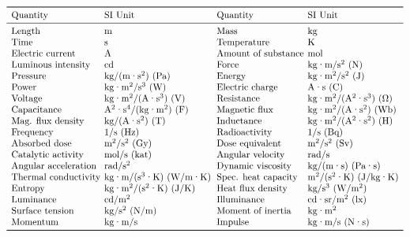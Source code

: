 {\[
\begin{array}{l@{\hskip 4pt}l@{\hskip 6pt}l@{\hskip 4pt}l}
\toprule
\text{Quantity} & \text{SI Unit} & \text{Quantity} & \text{SI Unit} \\
\midrule
\text{Length} & \text{m} & \text{Mass} & \text{kg} \\
\text{Time} & \text{s} & \text{Temperature} & \text{K} \\
\text{Electric current} & \text{A} & \text{Amount of substance} & \text{mol} \\
\text{Luminous intensity} & \text{cd} & \text{Force} & \text{kg·m/s$^2$ (N)} \\
\text{Pressure} & \text{kg/(m·s$^2$) (Pa)} & \text{Energy} & \text{kg·m$^2$/s$^2$ (J)} \\
\text{Power} & \text{kg·m$^2$/s$^3$ (W)} & \text{Electric charge} & \text{A·s (C)} \\
\text{Voltage} & \text{kg·m$^2$/(A·s$^3$) (V)} & \text{Resistance} & \text{kg·m$^2$/(A$^2$·s$^3$) ($\Omega$)} \\
\text{Capacitance} & \text{A$^2$·s$^4$/(kg·m$^2$) (F)} & \text{Magnetic flux} & \text{kg·m$^2$/(A·s$^2$) (Wb)} \\
\text{Mag. flux density} & \text{kg/(A·s$^2$) (T)} & \text{Inductance} & \text{kg·m$^2$/(A$^2$·s$^2$) (H)} \\
\text{Frequency} & \text{1/s (Hz)} & \text{Radioactivity} & \text{1/s (Bq)} \\
\text{Absorbed dose} & \text{m$^2$/s$^2$ (Gy)} & \text{Dose equivalent} & \text{m$^2$/s$^2$ (Sv)} \\
\text{Catalytic activity} & \text{mol/s (kat)} & \text{Angular velocity} & \text{rad/s} \\
\text{Angular acceleration} & \text{rad/s$^2$} & \text{Dynamic viscosity} & \text{kg/(m·s) (Pa·s)} \\
\text{Thermal conductivity} & \text{kg·m/(s$^3$·K) (W/m·K)} & \text{Spec. heat capacity} & \text{m$^2$/(s$^2$·K) (J/kg·K)} \\
\text{Entropy} & \text{kg·m$^2$/(s$^2$·K) (J/K)} & \text{Heat flux density} & \text{kg/s$^3$ (W/m$^2$)} \\
\text{Luminance} & \text{cd/m$^2$} & \text{Illuminance} & \text{cd·sr/m$^2$ (lx)} \\
\text{Surface tension} & \text{kg/s$^2$ (N/m)} & \text{Moment of inertia} & \text{kg·m$^2$} \\
\text{Momentum} & \text{kg·m/s} & \text{Impulse} & \text{kg·m/s (N·s)} \\
\bottomrule
\end{array}
\]
}
